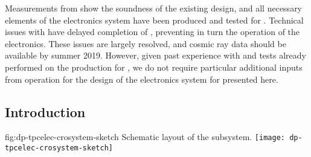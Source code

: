 Measurements from  show the soundness of the existing design, and all necessary elements of the  electronics system have been produced and tested for . Technical issues with  have delayed completion of , preventing in turn the operation of the electronics. These issues are largely resolved, and cosmic ray data should be available by summer 2019. However, given past experience with  and tests already performed on the production for , we do not require particular additional inputs from  operation for the design of the electronics system for  presented here. %

\begin{comment}  Anne's not sure this is needed.
This chapter is organized as follows. In this section we provide an overview of the \dword{dp} \dword{tpc} electronics system and discuss design considerations. In Section~\ref{sec:dp-tpcelec-design}, we give detailed descriptions of the principal components. This is followed by the discussion of the production scheme, quality assurance and control, and calibration program in Section~\ref{sec:dp-tpcelec-production}. Section~\ref{sec:dp-tpcelec-transport} briefly covers the transportation and handling, while Section~\ref{sec:dp-tpcelec-intfc} describes interfaces to other detector systems. Details on the installation, integration, and commissioning of the \dword{dp} \dword{tpc} electronics system underground are provided in Section~\ref{sec:dp-tpcelec-install}. Sections~\ref{sec:dp-tpcelec-risks} and~\ref{sec:dp-tpcelec-safety} address risks and safety, respectively. Section~\ref{sec:dp-tpcelec-org} presents the organizational structure of the \dword{dp} \dword{tpc} electronics consortium, discusses schedule, and provides the estimates of the core costs. 
\end{comment}

\subsection{Introduction}
\label{ssec:dp-tpcelec-intro}

\begin{dunefigure}{fig:dp-tpcelec-crosystem-sketch}
{Schematic layout of the   subsystem.}
\texttt{[image: dp-tpcelec-crosystem-sketch]}
\end{dunefigure}


